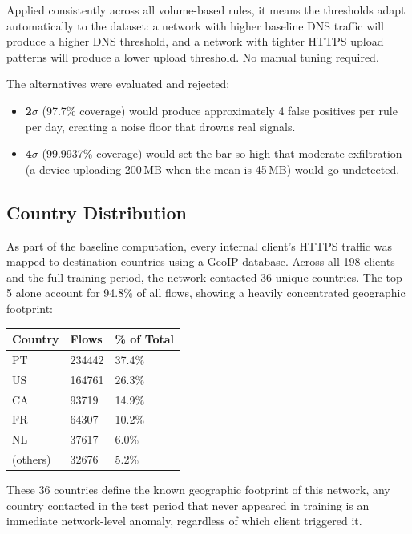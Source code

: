 \documentclass[
  11pt,
]{article}
\begin{document}
Applied consistently across all volume-based rules, it means the
thresholds adapt automatically to the dataset: a network with higher
baseline DNS traffic will produce a higher DNS threshold, and a network
with tighter HTTPS upload patterns will produce a lower upload
threshold. No manual tuning required. 

The alternatives were evaluated and rejected:
\begin{itemize}
  \item \textbf{2$\sigma$} (97.7\% coverage) would produce approximately 4 false positives per rule per day, creating a noise floor that drowns real signals.
  \item \textbf{4$\sigma$} (99.9937\% coverage) would set the bar so high that moderate exfiltration (a device uploading 200\,MB when the mean is 45\,MB) would go undetected.
\end{itemize}

\hypertarget{country-distribution}{%
\subsection{Country Distribution}\label{country-distribution}}

As part of the baseline computation, every internal client's HTTPS
traffic was mapped to destination countries using a GeoIP database.
Across all 198 clients and the full training period, the network
contacted 36 unique countries. The top 5 alone account for 94.8\% of all
flows, showing a heavily concentrated geographic footprint:

\begin{longtable}[]{@{}lll@{}}
\toprule\noalign{}
Country & Flows & \% of Total \\
\midrule\noalign{}
\endhead
\bottomrule\noalign{}
\endlastfoot
PT & 234442 & 37.4\% \\
US & 164761 & 26.3\% \\
CA & 93719 & 14.9\% \\
FR & 64307 & 10.2\% \\
NL & 37617 & 6.0\% \\
(others) & 32676 & 5.2\% \\
\end{longtable}

These 36 countries define the known geographic footprint of this
network, any country contacted in the test period that never appeared in
training is an immediate network-level anomaly, regardless of which
client triggered it.
\end{document}
